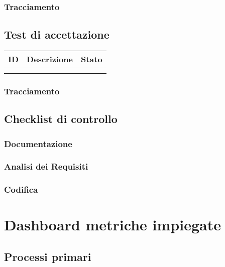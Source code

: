 {{    \subsubsection{Tracciamento}

\subsection{Test di accettazione}
    {\renewcommand{\arraystretch}{1.5}
    \begin{tabularx}{\textwidth}{p{}|p{}|X}
    \textbf{ID} & \textbf{Descrizione} & \textbf{Stato}  \\
    \hline
     &  & \\
    \hline
     &  &  \\
    \end{tabularx}}
    \subsubsection{Tracciamento}

\subsection{Checklist di controllo}

\subsubsection{Documentazione}
\subsubsection{Analisi dei Requisiti}
\subsubsection{Codifica}




\section{Dashboard metriche impiegate}
\subsection{Processi primari}
    
   
}}

